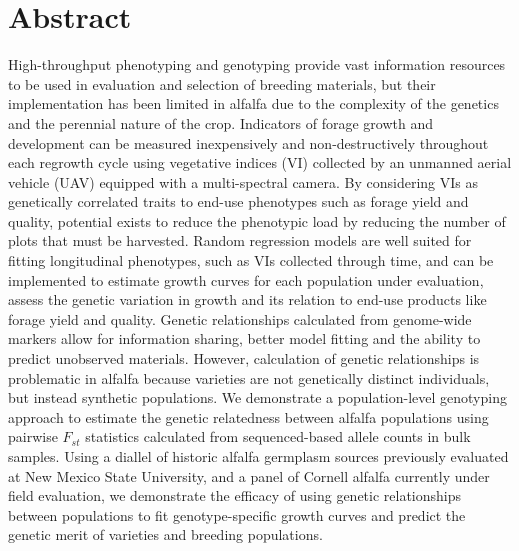 \documentclass[12pt, letterpaper]{article}
\begin{document}



\section{Abstract}

High-throughput phenotyping and genotyping provide vast information resources to be used in evaluation and selection of breeding materials, but their implementation has been limited in alfalfa due to the complexity of the genetics and the perennial nature of the crop. Indicators of forage growth and development can be measured inexpensively and non-destructively throughout each regrowth cycle using vegetative indices (VI) collected by an unmanned aerial vehicle (UAV) equipped with a multi-spectral camera. By considering VIs as genetically correlated traits to end-use phenotypes such as forage yield and quality, potential exists to reduce the phenotypic load by reducing the number of plots that must be harvested. Random regression models are well suited for fitting longitudinal phenotypes, such as VIs collected through time, and can be implemented to estimate growth curves for each population under evaluation, assess the genetic variation in growth and its relation to end-use products like forage yield and quality. Genetic relationships calculated from genome-wide markers allow for information sharing, better model fitting and the ability to predict unobserved materials. However, calculation of genetic relationships is problematic in alfalfa because varieties are not genetically distinct individuals, but instead synthetic populations. We demonstrate a population-level genotyping approach to estimate the genetic relatedness between alfalfa populations using pairwise $F_{st}$ statistics calculated from sequenced-based allele counts in bulk samples. Using a diallel of historic alfalfa germplasm sources previously evaluated at New Mexico State University, and a panel of Cornell alfalfa currently under field evaluation, we demonstrate the efficacy of using genetic relationships between populations to fit genotype-specific growth curves and predict the genetic merit of varieties and breeding populations. 
\end{document}

